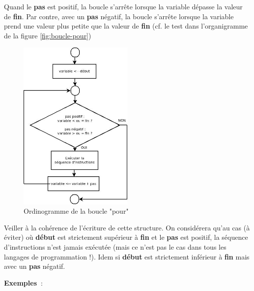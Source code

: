 		Quand le \textbf{pas} est positif, la boucle s'arrête
		lorsque la variable dépasse la valeur de \textbf{fin}. Par contre, avec
		un \textbf{pas} négatif, la boucle s'arrête lorsque la
		variable prend une valeur plus petite que la valeur de \textbf{fin}
		(cf. le test dans l'organigramme de la figure \vref{fig:boucle-pour})

		\begin{figure}[h]
		\centering
		\includegraphics[width=0.5\textwidth]{image/boucle-pour}
		\caption{Ordinogramme de la boucle "pour"}
		\label{fig:boucle-pour}
		\end{figure}

		Veiller à la cohérence de l’écriture de cette structure. On considérera
		qu’au cas (à éviter) où \textbf{début} est strictement supérieur à
		\textbf{fin} et le \textbf{pas} est positif, la séquence d’instructions
		n’est jamais exécutée (mais ce n’est pas le cas dans tous les langages
		de programmation !). Idem si \textbf{début} est strictement inférieur à
		\textbf{fin} mais avec un \textbf{pas} négatif.

		\textbf{Exemples~}:

		
